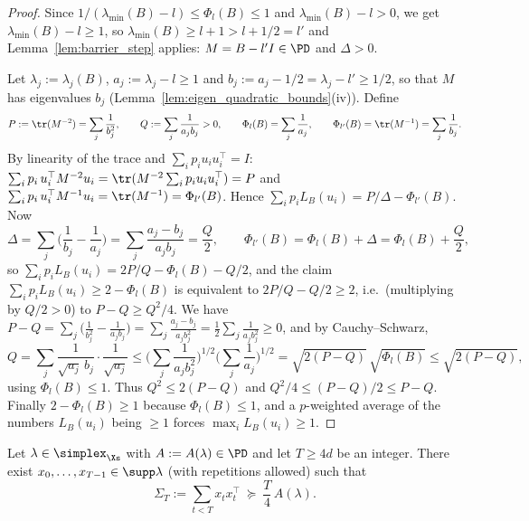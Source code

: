 \begin{proof}
\leanok
{}
Since $1/(\lambda_{\min}(B) - l) \le \Phi_l(B) \le 1$ and $\lambda_{\min}(B) - l > 0$, we get
$\lambda_{\min}(B) - l \ge 1$, so $\lambda_{\min}(B) \ge l + 1 > l + 1/2 = l'$ and
Lemma~\ref{lem:barrier_step} applies: $M = B - l'I \in \PD$ and $\Delta > 0$.

Let $\lambda_j := \lambda_j(B)$, $a_j := \lambda_j - l \ge 1$ and $b_j := a_j - 1/2 = \lambda_j - l'
\ge 1/2$, so that $M$ has eigenvalues $b_j$ (Lemma~\ref{lem:eigen_quadratic_bounds}(iv)). Define
\[
  P := \tr(M^{-2}) = \sum_j\frac{1}{b_j^2},\qquad
  Q := \sum_j\frac{1}{a_jb_j} > 0,\qquad
  \Phi_l(B) = \sum_j\frac1{a_j},\qquad \Phi_{l'}(B) = \tr(M^{-1}) = \sum_j\frac1{b_j} .
\]
By linearity of the trace and $\sum_ip_iu_iu_i^\top = I$: $\sum_ip_i\,u_i^\top M^{-2}u_i =
\tr(M^{-2}\sum_ip_iu_iu_i^\top) = P$ and $\sum_ip_i\,u_i^\top M^{-1}u_i = \tr(M^{-1}) =
\Phi_{l'}(B)$. Hence $\sum_ip_iL_B(u_i) = P/\Delta - \Phi_{l'}(B)$. Now
\[
  \Delta = \sum_j\Big(\frac1{b_j} - \frac1{a_j}\Big) = \sum_j\frac{a_j - b_j}{a_jb_j} = \frac{Q}{2},
  \qquad
  \Phi_{l'}(B) = \Phi_l(B) + \Delta = \Phi_l(B) + \frac Q2 ,
\]
so $\sum_ip_iL_B(u_i) = 2P/Q - \Phi_l(B) - Q/2$, and the claim $\sum_ip_iL_B(u_i) \ge 2 - \Phi_l(B)$
is equivalent to $2P/Q - Q/2 \ge 2$, i.e.\ (multiplying by $Q/2 > 0$) to $P - Q \ge Q^2/4$.
We have $P - Q = \sum_j\big(\tfrac1{b_j^2} - \tfrac1{a_jb_j}\big) = \sum_j\tfrac{a_j-b_j}{a_jb_j^2} =
\tfrac12\sum_j\tfrac1{a_jb_j^2} \ge 0$, and by Cauchy--Schwarz,
\[
  Q = \sum_j\frac{1}{\sqrt{a_j}\,b_j}\cdot\frac{1}{\sqrt{a_j}}
  \le \Big(\sum_j\frac1{a_jb_j^2}\Big)^{1/2}\Big(\sum_j\frac1{a_j}\Big)^{1/2}
  = \sqrt{2(P-Q)}\,\sqrt{\Phi_l(B)} \le \sqrt{2(P-Q)} ,
\]
using $\Phi_l(B) \le 1$. Thus $Q^2 \le 2(P - Q)$ and $Q^2/4 \le (P-Q)/2 \le P - Q$. Finally
$2 - \Phi_l(B) \ge 1$ because $\Phi_l(B) \le 1$, and a $p$-weighted average of the numbers
$L_B(u_i)$ being $\ge 1$ forces $\max_iL_B(u_i) \ge 1$.
\end{proof}

\begin{theorem}\label{thm:rounding}
\leanok
{}
Let $\lambda \in \simplex_{\Xs}$ with $A := A(\lambda) \in \PD$ and let $T \ge 4d$ be an integer.
There exist $x_0, \dots, x_{T-1} \in \supp\lambda$ (with repetitions allowed) such that
\[
  \Sigma_T := \sum_{t<T}x_tx_t^\top \ \succeq\ \frac T4\,A(\lambda) .
\]
\end{theorem}

